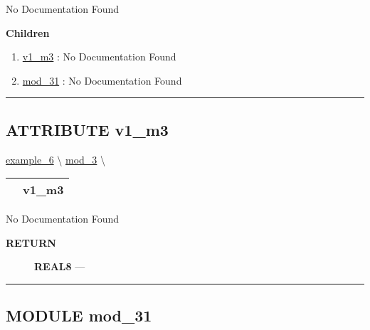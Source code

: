 No Documentation Found







\textbf{Children}
\begin{enumerate}
\item \hyperlink{ecldoc:intest.in1intest.example_6.mod_3.v1_m3}{v1\_m3}
: No Documentation Found
\item \hyperlink{ecldoc:intest.in1intest.example_6.mod_3.mod_31}{mod\_31}
: No Documentation Found
\end{enumerate}

\rule{\linewidth}{0.5pt}

\subsection*{\textsf{\colorbox{headtoc}{\color{white} ATTRIBUTE}
v1\_m3}}

\hypertarget{ecldoc:intest.in1intest.example_6.mod_3.v1_m3}{}
\hspace{0pt} \hyperlink{ecldoc:intest.in1intest.example_6}{example_6} \textbackslash 
\hspace{0pt} \hyperlink{ecldoc:intest.in1intest.example_6.mod_3}{mod_3} \textbackslash 

{\renewcommand{\arraystretch}{1.5}
\begin{tabularx}{\textwidth}{|>{\raggedright\arraybackslash}l|X|}
\hline
\hspace{0pt}\mytexttt{\color{red} } & \textbf{v1\_m3} \\
\hline
\end{tabularx}
}

\par





No Documentation Found








\par
\begin{description}
\item [\colorbox{tagtype}{\color{white} \textbf{\textsf{RETURN}}}] \textbf{REAL8} --- 
\end{description}




\rule{\linewidth}{0.5pt}
\subsection*{\textsf{\colorbox{headtoc}{\color{white} MODULE}
mod\_31}}

